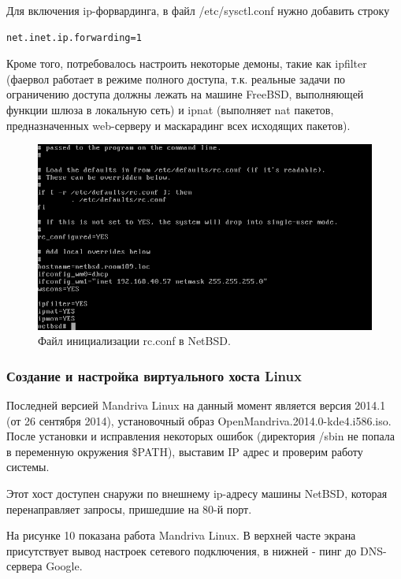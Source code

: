 Для включения ip-форвардинга, в файл /etc/sysctl.conf нужно добавить строку
\begin{Verbatim}[frame=single]
net.inet.ip.forwarding=1
\end{Verbatim}

Кроме того, потребовалось настроить некоторые демоны, такие как ipfilter (фаервол работает в режиме полного доступа, т.к. реальные задачи по ограничению доступа должны лежать на машине FreeBSD, выполняющей функции шлюза в локальную сеть) и ipnat (выполняет nat пакетов, предназначенных web-серверу и маскарадинг всех исходящих пакетов).

\begin{figure}[h!]
\centering
\includegraphics[scale=0.9]{res/netbsd-rcconf}
\caption{Файл инициализации rc.conf в NetBSD.}
\end{figure}

\subsubsection{Создание и настройка виртуального хоста Linux}

Последней версией Mandriva Linux на данный момент является версия 2014.1 (от 26 сентября 2014), установочный образ OpenMandriva.2014.0-kde4.i586.iso. После установки и исправления некоторых ошибок (директория /sbin не попала в переменную окружения \$PATH), выставим IP адрес и проверим работу системы.

Этот хост доступен снаружи по внешнему ip-адресу машины NetBSD, которая перенаправляет запросы, пришедшие на 80-й порт.

На рисунке 10 показана работа Mandriva Linux. В верхней часте экрана присутствует вывод настроек сетевого подключения, в нижней - пинг до DNS-сервера Google.

